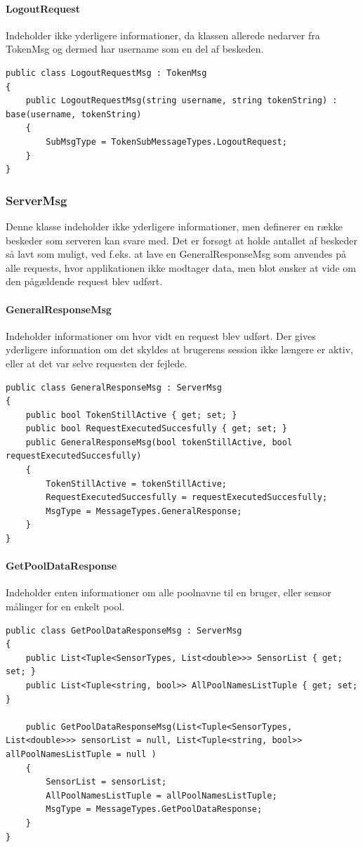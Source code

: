 \paragraph{LogoutRequest}
Indeholder ikke yderligere informationer, da klassen allerede nedarver fra TokenMsg og dermed har username som en del af beskeden.
\begin{lstlisting}[caption=LogoutRequest, label=code:LogoutRequest]
public class LogoutRequestMsg : TokenMsg
{
	public LogoutRequestMsg(string username, string tokenString) : base(username, tokenString)
	{
		SubMsgType = TokenSubMessageTypes.LogoutRequest;
	}
}
\end{lstlisting}

\subsubsection{ServerMsg}
Denne klasse indeholder ikke yderligere informationer, men definerer en række beskeder som serveren kan svare med. Det er forsøgt at holde antallet af beskeder så lavt som muligt, ved f.eks. at lave en GeneralResponseMsg som anvendes på alle requests, hvor applikationen ikke modtager data, men blot ønsker at vide om den pågældende request blev udført. 

\paragraph{GeneralResponseMsg}
Indeholder informationer om hvor vidt en request blev udført. Der gives yderligere information om det skyldes at brugerens session ikke længere er aktiv, eller at det var selve requesten der fejlede.
\begin{lstlisting}[caption=GeneralResponseMsg, label=code:GeneralResponseMsg]
public class GeneralResponseMsg : ServerMsg
{
	public bool TokenStillActive { get; set; }
	public bool RequestExecutedSuccesfully { get; set; }
	public GeneralResponseMsg(bool tokenStillActive, bool requestExecutedSuccesfully)
	{
		TokenStillActive = tokenStillActive;
		RequestExecutedSuccesfully = requestExecutedSuccesfully;
		MsgType = MessageTypes.GeneralResponse;
	}
}
\end{lstlisting}

\paragraph{GetPoolDataResponse}
Indeholder enten informationer om alle poolnavne til en bruger, eller sensor målinger for en enkelt pool.
\begin{lstlisting}[caption=GetPoolDataResponse, label=code:GetPoolDataResponse]
public class GetPoolDataResponseMsg : ServerMsg
{
	public List<Tuple<SensorTypes, List<double>>> SensorList { get; set; }
	public List<Tuple<string, bool>> AllPoolNamesListTuple { get; set; }
	
	public GetPoolDataResponseMsg(List<Tuple<SensorTypes, List<double>>> sensorList = null, List<Tuple<string, bool>> allPoolNamesListTuple = null )
	{
		SensorList = sensorList;
		AllPoolNamesListTuple = allPoolNamesListTuple;
		MsgType = MessageTypes.GetPoolDataResponse;
	}
}
\end{lstlisting}

